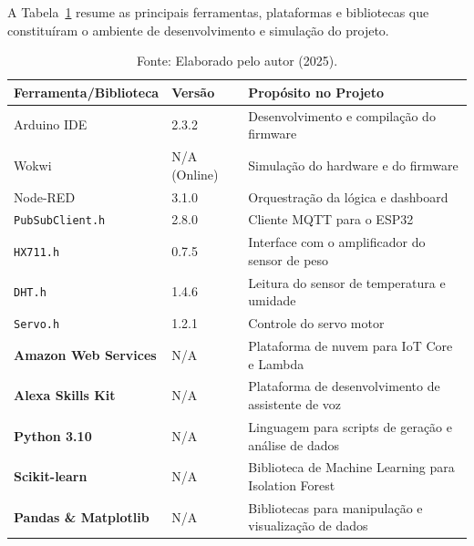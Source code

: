 A Tabela~\ref{tab:software_spec} resume as principais ferramentas, plataformas e bibliotecas que constituíram o ambiente de desenvolvimento e simulação do projeto.
\begin{table}[H]
    \centering
    \caption{Ferramentas e Bibliotecas de Software Utilizadas.}
    \label{tab:software_spec}
    \begin{tabular}{|l|l|l|}
    \hline
    \textbf{Ferramenta/Biblioteca} & \textbf{Versão} & \textbf{Propósito no Projeto} \\ \hline
    Arduino IDE & 2.3.2 & Desenvolvimento e compilação do firmware \\ \hline
    Wokwi & N/A (Online) & Simulação do hardware e do firmware \\ \hline
    Node-RED & 3.1.0 & Orquestração da lógica e dashboard \\ \hline
    \texttt{PubSubClient.h} & 2.8.0 & Cliente MQTT para o ESP32 \\ \hline
    
\texttt{HX711.h} & 0.7.5 & Interface com o amplificador do sensor de peso \\ \hline
    \texttt{DHT.h} & 1.4.6 & Leitura do sensor de temperatura e umidade \\ \hline
    \texttt{Servo.h} & 1.2.1 & Controle do servo motor \\ \hline
    \textbf{Amazon Web Services} & N/A & Plataforma de nuvem para IoT Core e Lambda \\ \hline
    \textbf{Alexa Skills Kit} & N/A & Plataforma de desenvolvimento de assistente de voz \\ \hline
    \textbf{Python 3.10} & N/A & Linguagem para scripts de geração e análise de dados \\ \hline
  
  \textbf{Scikit-learn} & N/A & Biblioteca de Machine Learning para Isolation Forest \\ \hline
    \textbf{Pandas \& Matplotlib} & N/A & Bibliotecas para manipulação e visualização de dados \\ \hline
    \end{tabular}
    \caption*{Fonte: Elaborado pelo autor (2025).}
    
\end{table}

